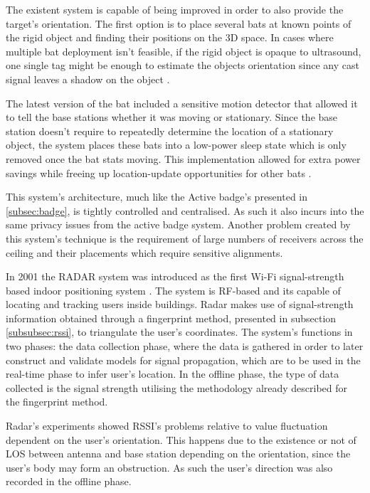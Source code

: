  The existent system is capable of being improved in order to also provide the target's orientation. The first option is to place several bats at known points of the rigid object and finding their positions on the 3D space. In cases where multiple bat deployment isn't feasible, if the rigid object is opaque to ultrasound, one single tag might be enough to estimate the objects orientation since any cast signal leaves a shadow on the object \cite{bat1}.

The latest version of the bat included a sensitive motion detector that allowed it to tell the base stations whether it was moving or stationary. Since the base station doesn't require to repeatedly determine the location of a stationary object, the system places these bats into a low-power sleep state which is only removed once the bat stats moving. This implementation allowed for extra power savings while freeing up location-update opportunities for other bats \cite{bat2}.

This system's architecture, much like the Active badge's presented in \ref{subsec:badge}, is tightly controlled and centralised. As such it also incurs into the same privacy issues from the active badge system. Another problem created by this system's technique is the requirement of large numbers of receivers across the ceiling and their placements which require sensitive alignments.


\label{subsec:radar}

In 2001 the RADAR system was introduced as the first Wi-Fi signal-strength based indoor positioning system \cite{radar}. The system is \ac{RF}-based and its capable of locating and tracking users inside buildings. Radar makes use of signal-strength information obtained through a fingerprint method, presented in subsection \ref{subsubsec:rssi}, to triangulate the user's coordinates. The system's functions in two phases: the data collection phase, where the data is gathered in order to later construct and validate models for signal propagation, which are to be used in the real-time phase to infer user's location. In the offline phase, the type of data collected is the signal strength utilising the methodology already described for the fingerprint method.

Radar's experiments showed \ac{RSSI}'s problems relative to value fluctuation dependent on the user's orientation. This happens due to the existence or not of \ac{LOS} between antenna and base station depending on the orientation, since the user's body may form an obstruction. As such the user's direction was also recorded in the offline phase.

